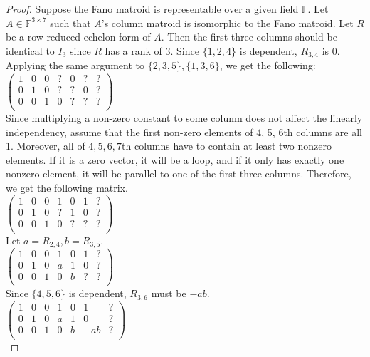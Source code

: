 \begin{proof}
Suppose the Fano matroid is representable over a given field $\mathbb{F}$.
Let $A \in \mathbb{F}^{3 \times 7}$ such that $A$'s column matroid is isomorphic to the Fano matroid.
Let $R$ be a row reduced echelon form of $A$.
Then the first three columns should be identical to $I_3$ since $R$ has a rank of 3.
Since $\{1, 2, 4\}$ is dependent, $R_{3, 4}$ is 0.
Applying the same argument to $\{2, 3, 5\}, \{1, 3, 6\}$, we get the following:\\
$\begin{pmatrix}
1 & 0 & 0 & ? & 0 & ? & ? \\
0 & 1 & 0 & ? & ? & 0 & ? \\
0 & 0 & 1 & 0 & ? & ? & ? \\
\end{pmatrix}$\\
Since multiplying a non-zero constant to some column does not affect the linearly independency, assume that the first non-zero elements of 4, 5, 6th columns are all 1.
Moreover, all of $4, 5, 6, 7$th columns have to contain at least two nonzero elements.
If it is a zero vector, it will be a loop, and if it only has exactly one nonzero element, it will be parallel to one of the first three columns.
Therefore, we get the following matrix.\\
$\begin{pmatrix}
1 & 0 & 0 & 1 & 0 & 1 & ? \\
0 & 1 & 0 & ? & 1 & 0 & ? \\
0 & 0 & 1 & 0 & ? & ? & ? \\
\end{pmatrix}$\\
Let $a = R_{2, 4}, b = R_{3, 5}$.\\
$\begin{pmatrix}
1 & 0 & 0 & 1 & 0 & 1 & ? \\
0 & 1 & 0 & a & 1 & 0 & ? \\
0 & 0 & 1 & 0 & b & ? & ? \\
\end{pmatrix}$\\
Since $\{4, 5, 6\}$ is dependent, $R_{3, 6}$ must be $-ab$.\\
$\begin{pmatrix}
1 & 0 & 0 & 1 & 0 & 1 & ? \\
0 & 1 & 0 & a & 1 & 0 & ? \\
0 & 0 & 1 & 0 & b & -ab & ? \\
\end{pmatrix}$\\

\end{proof}
